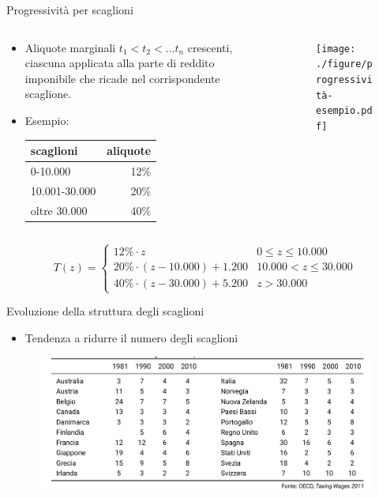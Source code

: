 \documentclass[11pt]{beamer}
\newcommand\€{\,\text{€}}
\begin{document}
\begin{frame}{Progressività per scaglioni}
\begin{columns}
\begin{column}{.4\columnwidth}
\small
\begin{itemize}
\item Aliquote marginali $t_1<t_2<\dots t_n$ crescenti, ciascuna applicata alla
parte di reddito imponibile che ricade nel corrispondente scaglione.
\item Esempio:
  \begin{tabular}{lr}
\toprule scaglioni & aliquote \\ \midrule 
0-10.000 & 12\% \\ 
  10.001-30.000 & 20\% \\ 
  oltre 30.000 & 40\% \\
  \bottomrule
\end{tabular}
\end{itemize}
\end{column}

\begin{column}{.6\columnwidth}
\begin{figure}
\centering
\texttt{[image: ./figure/progressività-esempio.pdf]}
\end{figure}
\end{column}
\end{columns}

  \begin{equation*}
  T(z)=
  \begin{cases}
    12\%\cdot z & 0\le z\le10.000\\
    20\%\cdot (z-10.000) + 1.200 & 10.000<z\le30.000\\
    40\%\cdot (z-30.000) + 5.200 & z > 30.000
  \end{cases}
\end{equation*}
\end{frame}

\begin{frame}{Evoluzione della struttura degli scaglioni}
\begin{itemize}
\item Tendenza a ridurre il numero degli scaglioni
\end{itemize}

\begin{figure}
\centering
\includegraphics[width=\linewidth]{./figure/evoluzione-numero-scaglioni.png}
\end{figure}
\end{frame}
\end{document}
